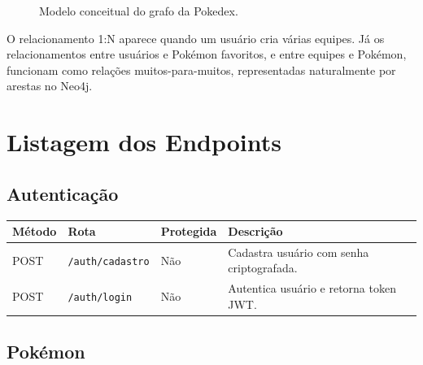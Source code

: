 \documentclass[12pt,a4paper]{article}
\begin{document}
\begin{figure}[H]
\centering
{}
\caption{Modelo conceitual do grafo da Pokedex.}
\end{figure}

O relacionamento 1:N aparece quando um usuário cria várias equipes. Já os relacionamentos entre usuários e Pokémon favoritos, e entre equipes e Pokémon, funcionam como relações muitos-para-muitos, representadas naturalmente por arestas no Neo4j.

\section{Listagem dos Endpoints}

\subsection{Autenticação}

\begin{table}[H]
\centering
\begin{tabular}{p{2cm}p{4.5cm}p{2cm}p{5cm}}
\toprule
\textbf{Método} & \textbf{Rota} & \textbf{Protegida} & \textbf{Descrição}\\
\midrule
POST & \texttt{/auth/cadastro} & Não & Cadastra usuário com senha criptografada.\\
POST & \texttt{/auth/login} & Não & Autentica usuário e retorna token JWT.\\
\bottomrule
\end{tabular}
\end{table}

\subsection{Pokémon}
\end{document}
